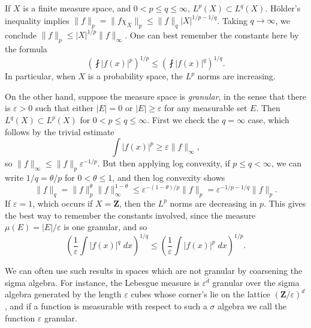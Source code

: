 \begin{example}
  If $X$ is a finite measure space, and $0 < p \leq q \leq \infty$, $L^p(X) \subset L^q(X)$. H\"{o}lder's inequality implies $\| f \|_p = \| f \chi_X \|_p \leq \| f \|_q |X|^{1/p-1/q}$. Taking $q \to \infty$, we conclude $\| f \|_p \leq | X |^{1/p} \| f \|_\infty$. One can best remember the constants here by the formula
  \[ \left( \fint |f(x)|^p \right)^{1/p} \leq \left( \fint |f(x)|^q \right)^{1/q}. \]
  In particular, when $X$ is a probability space, the $L^p$ norms are increasing.
\end{example}

\begin{example}
  On the other hand, suppose the measure space is {\it granular}, in the sense that there is $\varepsilon > 0$ such that either $|E| = 0$ or $|E| \geq \varepsilon$ for any measurable set $E$. Then $L^q(X) \subset L^p(X)$ for $0 < p \leq q \leq \infty$. First we check the $q = \infty$ case, which follows by the trivial estimate
  \[ \int |f(x)|^p \geq \varepsilon \| f \|_\infty, \]
  so $\| f \|_\infty \leq \| f \|_p \varepsilon^{-1/p}$. But then applying log convexity, if $p \leq q < \infty$, we can write $1/q = \theta/p$ for $0 < \theta \leq 1$, and then log convexity shows
  \[ \| f \|_q = \| f \|_p^\theta \| f \|_\infty^{1-\theta} \leq \varepsilon^{-(1 - \theta)/p} \| f \|_p = \varepsilon^{-1/p - 1/q} \| f \|_p. \]
  If $\varepsilon = 1$, which occurs if $X = \mathbf{Z}$, then the $L^p$ norms are decreasing in $p$. This gives the best way to remember the constants involved, since the measure $\mu(E) = |E|/\varepsilon$ is one granular, and so
  \[ \left( \frac{1}{\varepsilon} \int |f(x)|^q\; dx \right)^{1/q} \leq \left( \frac{1}{\varepsilon} \int |f(x)|^p\; dx \right)^{1/p}. \]
\end{example}

  

\begin{remark}
  We can often use such results in spaces which are not granular by coarsening the sigma algebra. For instance, the Lebesgue measure is $\varepsilon^d$ granular over the sigma algebra generated by the length $\varepsilon$ cubes whose corner's lie on the lattice $(\mathbf{Z}/\varepsilon)^d$, and if a function is measurable with respect to such a $\sigma$ algebra we call the function $\varepsilon$ granular.
\end{remark}

